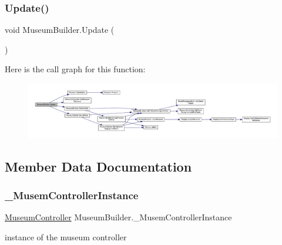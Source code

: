 \subsubsection{\texorpdfstring{Update()}{Update()}}
{\footnotesize\ttfamily void Museum\+Builder.\+Update (\begin{DoxyParamCaption}{ }\end{DoxyParamCaption})\hspace{0.3cm}{\ttfamily [private]}}

Here is the call graph for this function\+:
\nopagebreak
\begin{figure}[H]
\begin{center}
\leavevmode
\includegraphics[width=350pt]{class_museum_builder_a6f66f859260dac43de5248e3c4a0b25c_cgraph}
\end{center}
\end{figure}


\subsection{Member Data Documentation}
\mbox{\label{class_museum_builder_ab63ff4582a395d2172a05542dbca8341}} 
\subsubsection{\texorpdfstring{\+\_\+\+Musem\+Controller\+Instance}{\_MusemControllerInstance}}
{\footnotesize\ttfamily \mbox{\hyperlink{class_museum_controller}{Museum\+Controller}} Museum\+Builder.\+\_\+\+Musem\+Controller\+Instance\hspace{0.3cm}{\ttfamily [private]}}



instance of the museum controller 

\mbox{\label{class_museum_builder_a9966f9ce8cc1117cb72e3aa42ea1a490}} 
